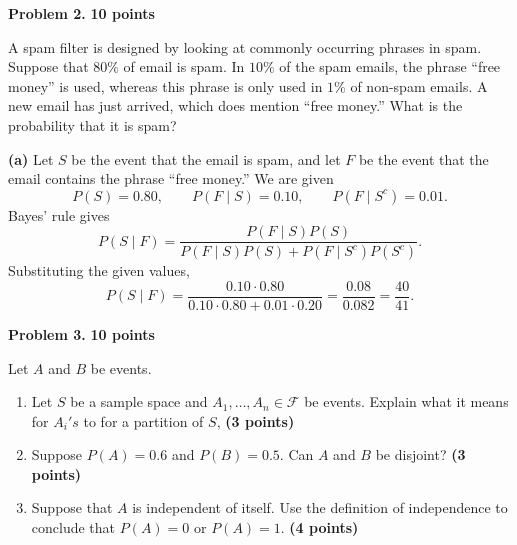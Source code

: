 \documentclass[11pt]{article}
\begin{document}
\newpage

\begin{problemheader}
\textbf{Problem 2.} \hfill \textbf{10 points}
\end{problemheader}

A spam filter is designed by looking at commonly occurring phrases in spam. Suppose that $80\%$ of email is spam. In $10\%$ of the spam emails, the phrase ``free money'' is used, whereas this phrase is only used in $1\%$ of non-spam emails. A new email has just arrived, which does mention ``free money.'' What is the probability that it is spam?

\begin{solutionbox}
\textbf{(a)} Let $S$ be the event that the email is spam, and let $F$ be the event that the email contains the phrase ``free money.'' We are given
\[
P(S)=0.80,\qquad P(F\mid S)=0.10,\qquad P(F\mid S^c)=0.01.
\]
Bayes' rule gives
\[
P(S\mid F)
=
\frac{P(F\mid S)P(S)}{P(F\mid S)P(S)+P(F\mid S^c)P(S^c)}.
\]
Substituting the given values,
\[
P(S\mid F)
=
\frac{0.10\cdot 0.80}{0.10\cdot 0.80+0.01\cdot 0.20}
=
\frac{0.08}{0.082}
=
\frac{40}{41}.
\]



\end{solutionbox}

\newpage
\begin{problemheader}
\textbf{Problem 3. } \hfill \textbf{10 points}
\end{problemheader}

Let $A$ and $B$ be events.

\begin{enumerate}[label=(\alph*),leftmargin=*]
    \item Let $S$ be a sample space and $A_1,\dots, A_n\in  \mathcal{F}$ be events. Explain what it means for $A_i's$ to for a partition of $S$,  \hfill \textbf{(3 points)}
    \item Suppose $P(A) = 0.6$ and $P(B)=0.5$. Can $A$ and $B$ be disjoint? \hfill \textbf{(3 points)}
   
    \item Suppose that $A$ is independent of itself. Use the definition of independence to conclude that $P(A)=0$ or $P(A)=1$. \hfill \textbf{(4 points)}
\end{enumerate}
\end{document}
